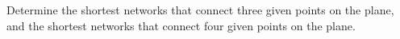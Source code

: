 Determine the shortest networks that connect three given points on the plane,
and the shortest networks that connect four given points on the plane.
